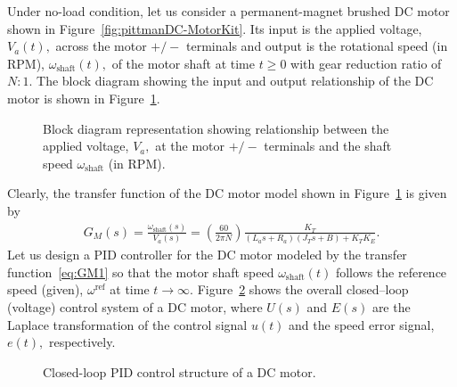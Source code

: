 Under no-load condition, let us consider a permanent-magnet  brushed DC motor shown in Figure~\ref{fig:pittmanDC-MotorKit}. Its input is the applied voltage, $V_a(t),$ across the motor $+/-$ terminals and output is the rotational speed (in RPM), $\omega_{\mathrm{shaft}}(t),$ of the motor shaft at time $t\ge 0$ with gear reduction ratio of $N:1.$ The block diagram showing the input and output relationship of the DC motor is shown in Figure~\ref{fig:dcMotorElecMechNoLoad}. %
%
\begin{figure}
  \centering
\caption{Block diagram representation showing relationship between the applied voltage, $V_a,$ at the motor $+/-$ terminals and  the shaft speed $\omega_{\mathrm{shaft}}$ (in RPM).}
\label{fig:dcMotorElecMechNoLoad}
\end{figure}
%
Clearly, the transfer function of the DC motor model shown in Figure~\ref{fig:dcMotorElecMechNoLoad} is given by %
%
\begin{align}
  \label{eq:GM1}
    G_M(s) = \frac{\omega_{\mathrm{shaft}}(s)}{V_a(s)} = \left(\frac{60}{2\pi N}\right)\frac{K_T}{\left(L_as + R_a\right)\left(J_Ts + B\right) + K_TK_E}.
\end{align}
%
Let us design a PID controller for the DC motor modeled by the transfer function~\eqref{eq:GM1} so that the motor shaft speed $\omega_{\mathrm{shaft}}(t)$ follows the reference speed (given), $\omega^{\mathrm{ref}}$ at time $t\to\infty.$ Figure~\ref{fig:dcMotorElecMechNoLoadControl} shows the overall closed--loop (voltage) control system of a DC motor, where $U(s)$ and $E(s)$ are the Laplace transformation of the control signal $u(t)$ and the speed error signal, $e(t),$ respectively. %
%
\begin{figure}
  \centering
\caption{Closed-loop PID control structure of a DC motor.}
\label{fig:dcMotorElecMechNoLoadControl}
\end{figure}
%

